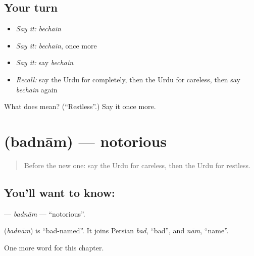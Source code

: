 \subsection*{Your turn}
\begin{itemize}
\raggedright
  \item \emph{Say it:} \emph{bechain}
  \item \emph{Say it:} \emph{bechain}, once more
  \item \emph{Say it:} say \emph{bechain}
  \item \emph{Recall:} say the Urdu for completely, then the Urdu for careless, then say \emph{bechain} again
\end{itemize}

\begin{tcolorbox}[breakable,colback=teal!4,colframe=teal!35!black,title={Before you move on}]
What does   mean? (\textquotedblleft{}Restless\textquotedblright{}.) Say it once more.
\end{tcolorbox}
\section[\texorpdfstring{\ur{بدنام} (badnām)}{بدنام (badnām)}]{ (badnām) — notorious}

\label{lesson:UR-C196-badnam}



\begin{quote}
Before the new one: say the Urdu for careless, then the Urdu for restless.
\end{quote}

\subsection*{You'll want to know: }
\textbf{} — \emph{badnām} — \textquotedblleft{}notorious\textquotedblright{}.

\begin{cousinweb}
\textbf{} (\emph{badnām}) is \textquotedblleft{}bad-named\textquotedblright{}. It joins Persian \emph{bad}, \textquotedblleft{}bad\textquotedblright{}, and \emph{nām}, \textquotedblleft{}name\textquotedblright{}.
\end{cousinweb}

\begin{grammarlens}[title={What you've built}]
One more word for this chapter.
\end{grammarlens}

